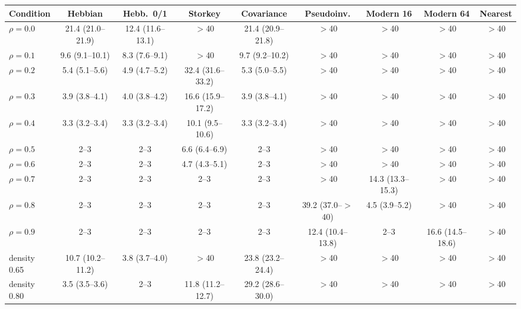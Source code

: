 \begin{tabular}{@{}lcccccccc@{}}
\toprule
Condition & Hebbian & Hebb.\ 0/1 & Storkey & Covariance & Pseudoinv. & Modern 16 & Modern 64 & Nearest \\
\midrule
$\rho=0.0$ & 21.4 (21.0--21.9) & 12.4 (11.6--13.1) & $>$40 & 21.4 (20.9--21.8) & $>$40 & $>$40 & $>$40 & $>$40 \\
$\rho=0.1$ & 9.6 (9.1--10.1) & 8.3 (7.6--9.1) & $>$40 & 9.7 (9.2--10.2) & $>$40 & $>$40 & $>$40 & $>$40 \\
$\rho=0.2$ & 5.4 (5.1--5.6) & 4.9 (4.7--5.2) & 32.4 (31.6--33.2) & 5.3 (5.0--5.5) & $>$40 & $>$40 & $>$40 & $>$40 \\
$\rho=0.3$ & 3.9 (3.8--4.1) & 4.0 (3.8--4.2) & 16.6 (15.9--17.2) & 3.9 (3.8--4.1) & $>$40 & $>$40 & $>$40 & $>$40 \\
$\rho=0.4$ & 3.3 (3.2--3.4) & 3.3 (3.2--3.4) & 10.1 (9.5--10.6) & 3.3 (3.2--3.4) & $>$40 & $>$40 & $>$40 & $>$40 \\
$\rho=0.5$ & 2--3 & 2--3 & 6.6 (6.4--6.9) & 2--3 & $>$40 & $>$40 & $>$40 & $>$40 \\
$\rho=0.6$ & 2--3 & 2--3 & 4.7 (4.3--5.1) & 2--3 & $>$40 & $>$40 & $>$40 & $>$40 \\
$\rho=0.7$ & 2--3 & 2--3 & 2--3 & 2--3 & $>$40 & 14.3 (13.3--15.3) & $>$40 & $>$40 \\
$\rho=0.8$ & 2--3 & 2--3 & 2--3 & 2--3 & 39.2 (37.0--$>$40) & 4.5 (3.9--5.2) & $>$40 & $>$40 \\
$\rho=0.9$ & 2--3 & 2--3 & 2--3 & 2--3 & 12.4 (10.4--13.8) & 2--3 & 16.6 (14.5--18.6) & $>$40 \\
\midrule
density 0.65 & 10.7 (10.2--11.2) & 3.8 (3.7--4.0) & $>$40 & 23.8 (23.2--24.4) & $>$40 & $>$40 & $>$40 & $>$40 \\
density 0.80 & 3.5 (3.5--3.6) & 2--3 & 11.8 (11.2--12.7) & 29.2 (28.6--30.0) & $>$40 & $>$40 & $>$40 & $>$40 \\
\bottomrule
\end{tabular}
